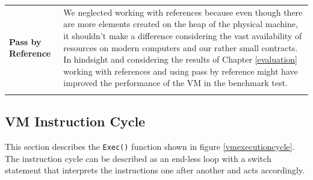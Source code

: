 \begin{tabular}[t]{ p{3cm} p{12.5cm}}
\raggedright
\textbf{Pass by Reference} &
We neglected working with references because even though there are more elements created on the heap of the physical machine, it shouldn't make a difference considering the vast availability of resources on modern computers and our rather small contracts. In hindsight and considering the results of Chapter \ref{evaluation} working with references and using pass by reference might have improved the performance of the VM in the benchmark test. \\ \\
\end{tabular}

\subsection{VM Instruction Cycle} \label{exec_cycle}
This section describes the \texttt{Exec()} function shown in figure \ref{vmexecutioncycle}. The instruction cycle can be described as an end-less loop with a switch statement that interprets the instructions one after another and acts accordingly.

